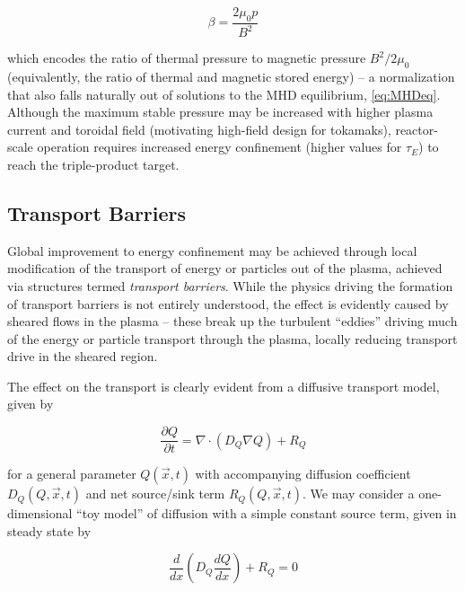 \begin{equation}\label{eq:beta}
 \beta = \frac{2 \mu_0 p}{B^2}
\end{equation}

\noindent which encodes the ratio of thermal pressure to magnetic pressure $B^2/2\mu_0$ (equivalently, the ratio of thermal and magnetic stored energy) -- a normalization that also falls naturally out of solutions to the MHD equilibrium, \cref{eq:MHDeq}.  Although the maximum stable pressure may be increased with higher plasma current and toroidal field (motivating high-field design for tokamaks), reactor-scale operation requires increased energy confinement (\ie higher values for $\tau_E$) to reach the triple-product target.

\subsection{Transport Barriers}\label{subsec:intro_barriers}

Global improvement to energy confinement may be achieved through local modification of the transport of energy or particles out of the plasma, achieved via structures termed \emph{transport barriers}.  While the physics driving the formation of transport barriers is not entirely understood, the effect is evidently caused by sheared flows in the plasma -- these break up the turbulent ``eddies'' driving much of the energy or particle transport through the plasma, locally reducing transport drive in the sheared region.  

The effect on the transport is clearly evident from a diffusive transport model, given by

\begin{equation}\label{eq:diffusion}
 \frac{\partial Q}{\partial t} = \nabla \cdot \left( D_Q \nabla Q \right) + R_Q
\end{equation}

\noindent for a general parameter $Q(\vec{x},t)$ with accompanying diffusion coefficient $D_Q(Q,\vec{x},t)$ and net source/sink term $R_Q(Q,\vec{x},t)$.  We may consider a one-dimensional ``toy model'' of diffusion with a simple constant source term, given in steady state by

\begin{equation}\label{eq:diffusion2}
 \frac{d}{dx} \left( D_Q \frac{dQ}{dx} \right) + R_Q = 0
\end{equation}

